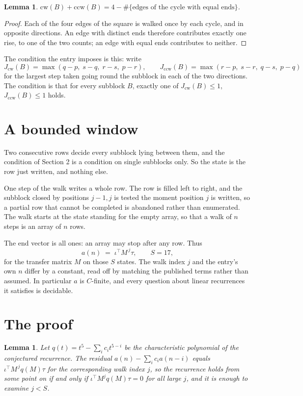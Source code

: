\documentclass[11pt,a4paper]{article}
\theoremstyle{plain}
\newtheorem{lemma}[theorem]{Lemma}
\theoremstyle{definition}
\begin{document}
\begin{lemma}\label{lem:sum}
$\mathrm{cw}(B)+\mathrm{ccw}(B)=4-\#\{\text{edges of the cycle with equal ends}\}$.
\end{lemma}

\begin{proof}
Each of the four edges of the square is walked once by each cycle, and in opposite directions.
An edge with distinct ends therefore contributes exactly one rise, to one of the two counts;
an edge with equal ends contributes to neither.
\end{proof}

The condition the entry imposes is this: write
\[
J_{\mathrm{cw}}(B)=\max(q-p,\;s-q,\;r-s,\;p-r),\qquad J_{\mathrm{ccw}}(B)=\max(r-p,\;s-r,\;q-s,\;p-q)
\]
for the largest step taken going round the subblock in each of the two directions. The condition is that for every subblock $B$, exactly one of $J_{\mathrm{cw}}(B)\le 1$, $J_{\mathrm{ccw}}(B)\le 1$ holds.

\section{A bounded window}

Two consecutive rows decide every subblock lying between them, and the condition of Section 2 is a condition on single subblocks only. So the state is the row just written, and nothing else.

One step of the walk writes a whole row. The row is filled left to right, and the subblock
closed by positions $j-1,j$ is tested the moment position $j$ is written, so a partial row that
cannot be completed is abandoned rather than enumerated. The walk starts at the state standing
for the empty array, so that a walk of $n$ steps is an array of $n$ rows.

The end vector is all ones: an array may stop after any row. Thus
\[
a(n)\;=\;\iota^{\!\top}M^{\,j}\tau ,\qquad S=17,
\]
for the transfer matrix $M$ on those $S$ states. The walk index $j$ and the entry's own $n$
differ by a constant, read off by matching the published terms rather than assumed. In
particular $a$ is $C$-finite, and every question about linear recurrences it satisfies is
decidable.

\section{The proof}

\begin{lemma}\label{lem:crit}
Let $q(t)=t^{5}-\sum_i c_it^{5-i}$ be the characteristic polynomial of the
conjectured recurrence. The residual $a(n)-\sum_ic_ia(n-i)$ equals
$\iota^{\!\top}M^{\,j}q(M)\tau$ for the corresponding walk index $j$, so the recurrence
holds from some point on if and only if $\iota^{\!\top}M^{j}q(M)\tau=0$ for all large $j$,
and it is enough to examine $j<S$.
\end{lemma}
\end{document}
